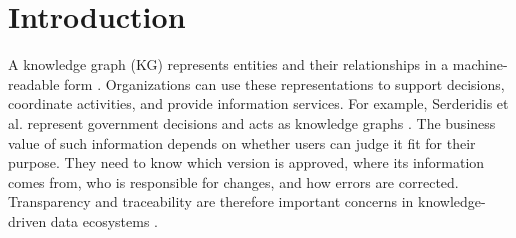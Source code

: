 \documentclass[journal]{IEEEtran}
\begin{document}
%
\IEEEpeerreviewmaketitle

\section{Introduction}
\label{sec:introduction}



A knowledge graph (KG) represents entities and their relationships
in a machine-readable form \cite{Hogan2021KnowledgeGraphs}.
Organizations can use these representations to support decisions,
coordinate activities, and provide information services.
For example, Serderidis et al. represent government decisions
and acts as knowledge graphs \cite{serderidis2024d2kg}.
The business value of such information depends on whether users
can judge it fit for their purpose. They need to know which
version is approved, where its information comes from, who is
responsible for changes, and how errors are corrected.
Transparency and traceability are therefore important concerns
in knowledge-driven data ecosystems
\cite{geisler2021transparency}.
\end{document}
